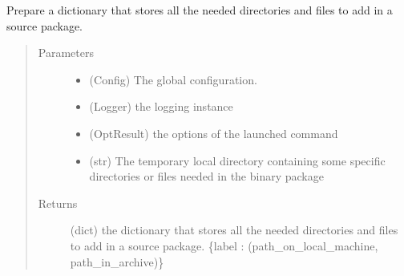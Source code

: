 \documentclass[a4paper,10pt,english]{sphinxmanual}
\begin{document}
\begin{fulllineitems}
\label{\detokenize{apidoc_commands/commands:commands.package.source_package}}
Prepare a dictionary that stores all the needed directories and files 
to add in a source package.
\begin{quote}\begin{description}
\item[{Parameters}] \leavevmode\begin{itemize}
\item {} 
 \textendash{} (Config) The global configuration.

\item {} 
 \textendash{} (Logger) the logging instance

\item {} 
 \textendash{} (OptResult) the options of the launched command

\item {} 
 \textendash{} (str)
The temporary local directory containing some specific directories
or files needed in the binary package

\end{itemize}

\item[{Returns}] \leavevmode
(dict)
the dictionary that stores all the needed directories and files
to add in a source package.
\{label : (path\_on\_local\_machine, path\_in\_archive)\}

\end{description}\end{quote}

\end{fulllineitems}

\end{document}
